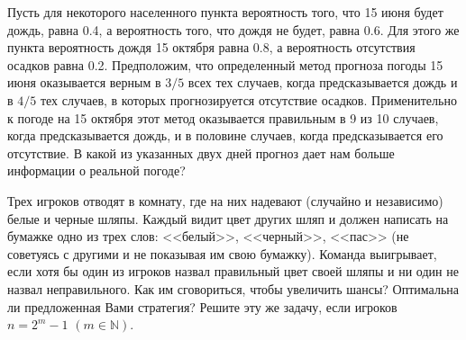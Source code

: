 \begin{comment}
\begin{problem}
ТО КАК СЕЙЧАС ПЛОХО, см. 

http://dcam.mipt.ru/students/study/stohanaliz-files/ Задание по теории вероятнсотей 2010

Эта таблица ничуть не помогает в восприятии:(

В таблице приведен прогноз погоды в г. Долгопрудный:
$p$ - вероятность наличия/отсутствия осадков, $q$ - вероятность того, что прогноз окажется верным.
\begin{table}[h]
\caption{Прогноз погоды}
\begin{center}
\begin{tabular}{|c|c|c|c|c|}
\hline
 &$p_{rain}$  &$p_{fine}$ & $q_{rain}$ & $q_{fine}$  \\
\hline
$15$ июня & $0.4$ & $0.6$ & $3/5$ & $4/5$\\
\hline
$15$ октября & $0.8$ & $0.2$ & $9/10$ & $1/2$\\
\hline
\end{tabular}
\end{center}
\end{table}
В какой из указанных двух дней прогноз дает нам больше информации о реальной погоде?
\end{problem}
\end{comment}
\begin{problem}
Пусть для некоторого населенного пункта вероятность того, что 15 июня будет дождь, равна 0.4, а вероятность того, что дождя не будет, равна 0.6. Для этого же пункта вероятность дождя 15 октября равна 0.8, а вероятность отсутствия осадков равна 0.2. Предположим, что определенный метод прогноза погоды 15 июня оказывается верным в $3/5$ всех тех случаев, когда предсказывается дождь и в $4/5$ тех случаев, в которых прогнозируется отсутствие осадков. Применительно к погоде на 15 октября этот метод оказывается правильным в 9 из 10 случаев, когда предсказывается дождь, и в половине случаев, когда предсказывается его отсутствие. В какой из указанных двух дней прогноз дает нам больше информации о реальной погоде?
\end{problem}


\begin{problem}

Трех игроков отводят в комнату, где на них надевают (случайно и независимо) белые и черные шляпы. Каждый видит 
цвет других шляп и должен написать на бумажке одно из трех слов: <<белый>>, <<черный>>, <<пас>> 
(не советуясь с другими и не показывая им свою бумажку). Команда выигрывает, если хотя бы один из игроков назвал правильный 
цвет своей шляпы и ни один не назвал неправильного. Как им сговориться, чтобы увеличить шансы? Оптимальна ли предложенная Вами стратегия?
Решите эту же задачу, если игроков $n=2^m -1$ $( m\in {\mathbb N} )$. 
\end{problem}


